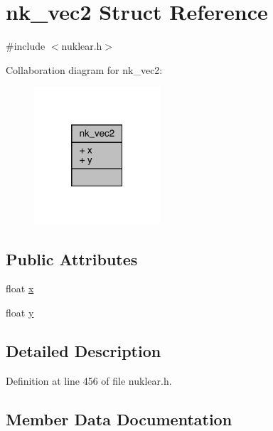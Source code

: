 \hypertarget{structnk__vec2}{}\section{nk\+\_\+vec2 Struct Reference}
\label{structnk__vec2}


{\ttfamily \#include $<$nuklear.\+h$>$}



Collaboration diagram for nk\+\_\+vec2\+:
\nopagebreak
\begin{figure}[H]
\begin{center}
\leavevmode
\includegraphics[width=133pt]{structnk__vec2__coll__graph}
\end{center}
\end{figure}
\subsection*{Public Attributes}
\begin{DoxyCompactItemize}
\item 
float \mbox{\hyperlink{structnk__vec2_ac5f81ca9850b5c51081217c301cfea45}{x}}
\item 
float \mbox{\hyperlink{structnk__vec2_af9ce34510fcf72827a980f5d92d78f1c}{y}}
\end{DoxyCompactItemize}


\subsection{Detailed Description}


Definition at line 456 of file nuklear.\+h.



\subsection{Member Data Documentation}
\mbox{\label{structnk__vec2_ac5f81ca9850b5c51081217c301cfea45}} 
